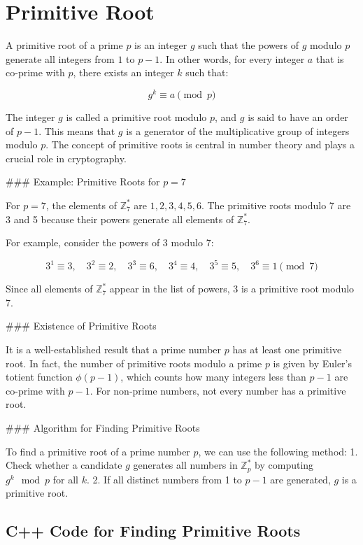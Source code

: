 \documentclass[10pt,a4paper]{article}
\begin{document}
\section*{Primitive Root}

A primitive root of a prime \(p\) is an integer \(g\) such that the powers of \(g\) modulo \(p\) generate all integers from \(1\) to \(p-1\). In other words, for every integer \(a\) that is co-prime with \(p\), there exists an integer \(k\) such that:

\[
g^k \equiv a \pmod{p}
\]

The integer \(g\) is called a primitive root modulo \(p\), and \(g\) is said to have an order of \(p-1\). This means that \(g\) is a generator of the multiplicative group of integers modulo \(p\). The concept of primitive roots is central in number theory and plays a crucial role in cryptography.

### Example: Primitive Roots for \(p = 7\)

For \(p = 7\), the elements of \( \mathbb{Z}_7^* \) are \(1, 2, 3, 4, 5, 6\). The primitive roots modulo 7 are 3 and 5 because their powers generate all elements of \( \mathbb{Z}_7^* \).

For example, consider the powers of 3 modulo 7:

\[
3^1 \equiv 3, \quad 3^2 \equiv 2, \quad 3^3 \equiv 6, \quad 3^4 \equiv 4, \quad 3^5 \equiv 5, \quad 3^6 \equiv 1 \pmod{7}
\]

Since all elements of \( \mathbb{Z}_7^* \) appear in the list of powers, 3 is a primitive root modulo 7.

### Existence of Primitive Roots

It is a well-established result that a prime number \(p\) has at least one primitive root. In fact, the number of primitive roots modulo a prime \(p\) is given by Euler's totient function \(\phi(p-1)\), which counts how many integers less than \(p-1\) are co-prime with \(p-1\). For non-prime numbers, not every number has a primitive root.

### Algorithm for Finding Primitive Roots

To find a primitive root of a prime number \(p\), we can use the following method:
1. Check whether a candidate \(g\) generates all numbers in \( \mathbb{Z}_p^* \) by computing \(g^k \mod p\) for all \(k\).
2. If all distinct numbers from 1 to \(p-1\) are generated, \(g\) is a primitive root.

\subsection*{C++ Code for Finding Primitive Roots}
\end{document}
